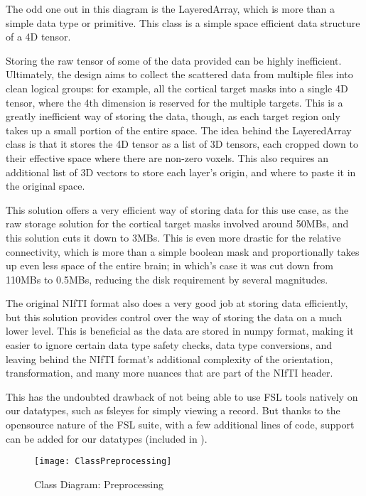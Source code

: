 The odd one out in this diagram is the LayeredArray, which is more than a simple data type or primitive. This class is a simple space efficient data structure of a 4D tensor.\par
Storing the raw tensor of some of the data provided can be highly inefficient. Ultimately, the design aims to collect the scattered data from multiple files into clean logical groups: for example, all the cortical target masks into a single 4D tensor, where the 4th dimension is reserved for the multiple targets. This is a greatly inefficient way of storing the data, though, as each target region only takes up a small portion of the entire space. The idea behind the LayeredArray class is that it stores the 4D tensor as a list of 3D tensors, each cropped down to their effective space where there are non-zero voxels. This also requires an additional list of 3D vectors to store each layer's origin, and where to paste it in the original space.\par
This solution offers a very efficient way of storing data for this use case, as the raw storage solution for the cortical target masks involved around 50MBs, and this solution cuts it down to 3MBs. This is even more drastic for the relative connectivity, which is more than a simple boolean mask and proportionally takes up even less space of the entire brain; in which's case it was cut down from 110MBs to 0.5MBs, reducing the disk requirement by several magnitudes.\par
The original \ac{NIfTI} format also does a very good job at storing data efficiently, but this solution provides control over the way of storing the data on a much lower level. This is beneficial as the data are stored in numpy format, making it easier to ignore certain data type safety checks, data type conversions, and leaving behind the \ac{NIfTI} format's additional complexity of the orientation, transformation, and many more nuances that are part of the \ac{NIfTI} header.\par
This has the undoubted drawback of not being able to use \ac{FSL} tools natively on our datatypes, such as fsleyes for simply viewing a record. But thanks to the opensource nature of the \ac{FSL} suite, with a few additional lines of code, support can be added for our datatypes (included in ).

\begin{figure}[H]
\centering
\texttt{[image: ClassPreprocessing]}
\caption{Class Diagram: Preprocessing}
\label{fig:digclspre}
\end{figure}

